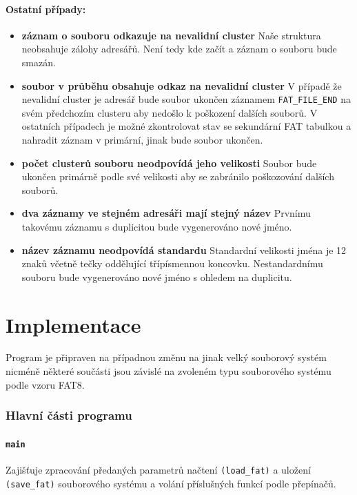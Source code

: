 \documentclass[12pt]{article}
\begin{document}
\pagebreak

\paragraph{Ostatní případy:}
\begin{itemize}
\item \textbf{záznam o souboru odkazuje na nevalidní cluster} Naše struktura neobsahuje zálohy adresářů. Není tedy kde začít a záznam o souboru bude smazán. 

\item \textbf{soubor v průběhu obsahuje odkaz na nevalidní cluster} V případě že nevalidní cluster je adresář bude soubor ukončen záznamem \texttt{FAT\_FILE\_END} na svém předchozím clusteru aby nedošlo k poškození dalších souborů. V ostatních případech je možné zkontrolovat stav se sekundární FAT tabulkou a nahradit záznam v primární, jinak bude soubor ukončen.

\item \textbf{počet clusterů souboru neodpovídá jeho velikosti} Soubor bude ukončen primárně podle své velikosti aby se zabránilo poškozování dalších souborů.

\item \textbf{dva záznamy ve stejném adresáři mají stejný název} Prvnímu takovému záznamu s duplicitou bude vygenerováno nové jméno.

\item \textbf{název záznamu neodpovídá standardu} Standardní velikosti jména je 12 znaků včetně tečky oddělující třípísmennou koncovku. Nestandardnímu souboru bude vygenerováno nové jméno s ohledem na duplicitu.
\end{itemize}

\pagebreak

\section{Implementace}
Program je připraven na případnou změnu na jinak velký souborový systém nicméně některé součásti jsou závislé na zvoleném typu souborového systému podle vzoru FAT8.

\subsubsection{Hlavní části programu} 

\paragraph{\texttt{main}}
Zajišťuje zpracování předaných parametrů načtení \texttt{(load\_fat)} a uložení \texttt{(save\_fat)} souborového systému a volání příslušných funkcí podle přepínačů.
\end{document}
